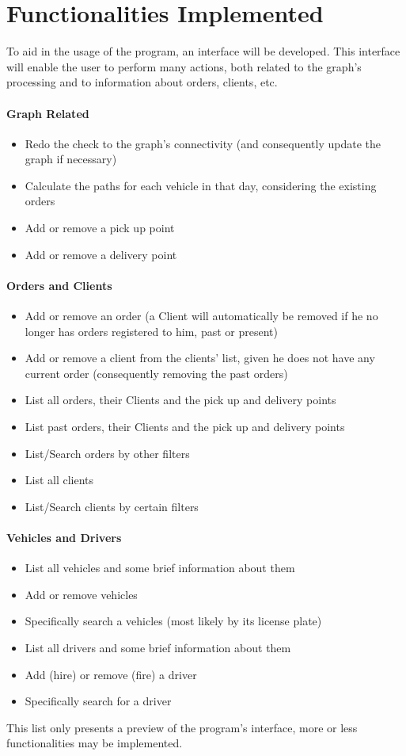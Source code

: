 \chapter{Functionalities Implemented}

To aid in the usage of the program, an interface will be developed. This interface will enable the user to perform many actions, both related to the graph's processing and to information about orders, clients, etc.

\subsubsection{Graph Related}
\begin{itemize}
    \item Redo the check to the graph's connectivity (and consequently update the graph if necessary)
    \item Calculate the paths for each vehicle in that day, considering the existing orders
    \item Add or remove a pick up point
    \item Add or remove a delivery point
\end{itemize}

\subsubsection{Orders and Clients}
\begin{itemize}
    \item Add or remove an order (a Client will automatically be removed if he no longer has orders registered to him, past or present)
    \item Add or remove a client from the clients' list, given he does not have any current order (consequently removing the past orders)
    \item List all orders, their Clients and the pick up and delivery points
    \item List past orders, their Clients and the pick up and delivery points
    \item List/Search orders by other filters
    \item List all clients 
    \item List/Search clients by certain filters
\end{itemize}

\subsubsection{Vehicles and Drivers}
\begin{itemize}
    \item List all vehicles and some brief information about them
    \item Add or remove vehicles
    \item Specifically search a vehicles (most likely by its license plate)
    \item List all drivers and some brief information about them
    \item Add (hire) or remove (fire) a driver
    \item Specifically search for a driver
\end{itemize}

This list only presents a preview of the program's interface, more or less functionalities may be implemented.